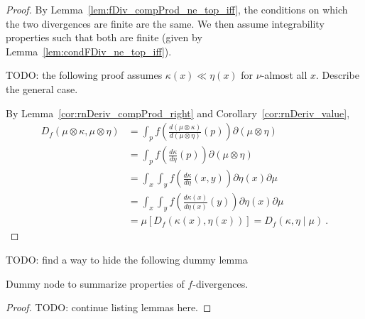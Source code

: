 \begin{proof} \leanok
{}
By Lemma~\ref{lem:fDiv_compProd_ne_top_iff}, the conditions on which the two divergences are finite are the same. We then assume integrability properties such that both are finite (given by Lemma~\ref{lem:condFDiv_ne_top_iff}).

TODO: the following proof assumes $\kappa(x) \ll \eta(x)$ for $\nu$-almost all $x$. Describe the general case.

By Lemma~\ref{cor:rnDeriv_compProd_right} and Corollary~\ref{cor:rnDeriv_value},
\begin{align*}
D_f(\mu \otimes \kappa, \mu \otimes \eta)
&= \int_{p} f\left(\frac{d (\mu \otimes \kappa)}{d (\mu \otimes \eta)}(p)\right) \partial(\mu \otimes \eta)
\\
&= \int_{p} f\left(\frac{d \kappa}{d \eta}(p)\right) \partial(\mu \otimes \eta)
\\
&= \int_x \int_y f\left(\frac{d \kappa}{d \eta}(x, y)\right) \partial \eta(x) \partial \mu
\\
&= \int_x \int_y f\left(\frac{d \kappa(x)}{d \eta(x)}(y)\right) \partial \eta(x) \partial \mu
\\
&= \mu\left[D_f(\kappa(x), \eta(x))\right]
= D_f(\kappa, \eta \mid \mu)
\: .
\end{align*}
\end{proof}




TODO: find a way to hide the following dummy lemma
\begin{lemma}
  \label{lem:fDiv_properties}
  \leanok
  Dummy node to summarize properties of $f$-divergences.
\end{lemma}

\begin{proof}\leanok
{}
TODO: continue listing lemmas here.
\end{proof}









